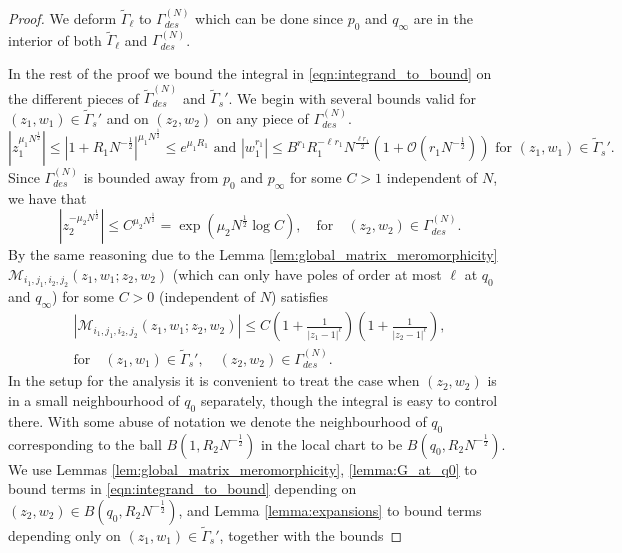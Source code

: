 \documentclass[11pt]{article}
\theoremstyle{plain}
\theoremstyle{definition}
\numberwithin{equation}{section}
\begin{document}
\begin{proof}
We deform $\widetilde{\Gamma}_{\ell}$ to $\Gamma_{des}^{(N)}$ which can be done since $p_0$ and $q_{\infty}$ are in the interior of both $\widetilde{\Gamma}_{\ell}$ and $\Gamma_{des}^{(N)}$.


In the rest of the proof we bound the integral in \eqref{eqn:integrand_to_bound} on the different pieces of $\widetilde{\Gamma}_{des}^{(N)}$ and $\widetilde{\Gamma}_s'$. 
We begin with several bounds valid for $(z_1,w_1)\in\widetilde{\Gamma}_s'$ and on $(z_2,w_2)$ on any piece of $\Gamma_{des}^{(N)}$. 
\begin{equation}\label{eqn:z1bound}
\left|z_1^{\mu_1 N^{\frac{1}{2}}}\right|\leq\left|1+{R_1}{N^{-\frac{1}{2}}}\right|^{\mu_1 N^{\frac{1}{2}}}\leq e^{\mu_1 R_1} \text{ and  } 
|w_1^{r_1}|
\leq
B^{r_1} R_1^{-\ell r_1} 
N^{\frac{\ell r_1}{2}} 
\left(1+\mathcal{O}\left( r_1N^{-\frac{1}{2}}\right)\right)
\text{ for }(z_1,w_1)\in\widetilde{\Gamma}_s'.
\end{equation}
Since $\Gamma_{des}^{(N)}$ is bounded away from $p_0$ and $p_{\infty}$ for some $C>1$ independent of $N$, we have that
 \begin{equation}\label{eqn:z2bound}
 \left| {z_2^{-\mu_2N^{\frac{1}{2}}}}\right|\leq C^{\mu_2N^{\frac{1}{2}}}=\exp\left(\mu_2N^{\frac{1}{2}}\log C\right),\quad\text{for}\quad (z_2,w_2)\in \Gamma_{des}^{(N)}.
 \end{equation}
By the same reasoning due to the Lemma \ref{lem:global_matrix_meromorphicity} %
$\boldsymbol{\mathcal{M}}_{i_1,j_1,i_2,j_2}(z_1,w_1;z_2,w_2)$ (which can only have poles of order at most $\ell$ at $q_0$ and $q_{\infty}$) for some $C>0$ (independent of $N$) satisfies
\begin{multline}\label{eqn:global_matrix_proof}
\left|\boldsymbol{\mathcal{M}}_{i_1,j_1,i_2,j_2}(z_1,w_1;z_2,w_2)\right | \leq C\left(1+\frac{1}{|z_1-1|^{\ell}}\right)\left(1+\frac{1}{ |z_2-1 |^{\ell}}\right),%
 \\\text{for}\quad (z_1,w_1)\in\widetilde{\Gamma}_s',\quad (z_2,w_2)\in\Gamma_{des}^{(N)}.
\end{multline}
%
%
In the setup for the analysis it is convenient to treat the case when $(z_2,w_2)$ is in a small neighbourhood of $q_0$ separately, though the integral is easy to control there. With some abuse of notation we denote the neighbourhood of $q_{0}$ corresponding to the ball $B(1, R_2 N^{-\frac{1}{2}})$ in the local chart to be $B(q_0, R_2 N^{-\frac{1}{2}})$. We use Lemmas \ref{lem:global_matrix_meromorphicity}, \ref{lemma:G_at_q0} to bound terms in \eqref{eqn:integrand_to_bound} depending on $(z_2,w_2)\in B(q_0, R_2 N^{-\frac{1}{2}})$, and Lemma  \ref{lemma:expansions} to bound terms depending only on $(z_1,w_1)\in \widetilde{\Gamma}_s'$, together with the bounds

\end{proof}
\end{document}
